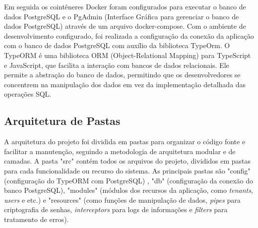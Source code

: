 Em seguida os cointêneres Docker foram configurados para executar o banco de dados PostgreSQL e o PgAdmin (Interface Gráfica para gerenciar o banco de dados PostgreSQL) através de um arquivo docker-compose. Com o ambiente de desenvolvimento configurado, foi realizada a configuração da conexão da aplicação com o banco de dados PostgreSQL com auxílio da biblioteca TypeOrm. O TypeORM é uma biblioteca ORM (Object-Relational Mapping) para TypeScript e JavaScript, que facilita a interação com bancos de dados relacionais. Ele permite a abstração do banco de dados, permitindo que os desenvolvedores se concentrem na manipulação dos dados em vez da implementação detalhada das operações SQL.

\subsection{Arquitetura de Pastas}\label{subsec:arquitetura_pastas}

A arquitetura do projeto foi dividida em pastas para organizar o código fonte e facilitar a manutenção, seguindo a metodologia de arquitetura modular e de camadas. A pasta "src" contém todos os arquivos do projeto, divididos em pastas para cada funcionalidade ou recurso do sistema. As principais pastas são "config" (configuração do TypeORM com PostgreSQL) , "db" (configuração da conexão do banco PostgreSQL), "modules" (módulos dos recursos da aplicação, como \textit{tenants}, \textit{users} e etc.) e "resources" (como funções de manipulação de dados, \textit{pipes} para criptografia de senhas, \textit{interceptors} para logs de informações e \textit{filters} para tratamento de erros).

